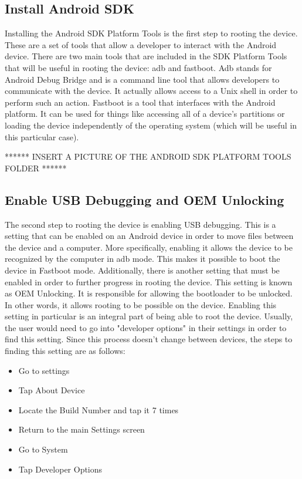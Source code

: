 \subsection{Install Android SDK}
Installing the Android SDK Platform Tools is the first step to rooting the device. These are a set of tools that allow a developer to interact with the Android device.
There are two main tools that are included in the SDK Platform Tools that will be useful in rooting the device: adb and fastboot. Adb stands for Android Debug Bridge and is 
a command line tool that allows developers to communicate with the device. It actually allows access to a Unix shell in order to perform such an action. Fastboot is a tool that 
interfaces with the Android platform. It can be used for things like accessing all of a device's partitions or loading the device independently of the operating system 
(which will be useful in this particular case).

****** INSERT A PICTURE OF THE ANDROID SDK PLATFORM TOOLS FOLDER ******

\subsection{Enable USB Debugging and OEM Unlocking}
The second step to rooting the device is enabling USB debugging. This is a setting that can be enabled on an Android device in order to move files between the device 
and a computer. More specifically, enabling it allows the device to be recognized by the computer in adb mode. This makes it possible to boot the device in Fastboot mode. 
Additionally, there is another setting that must be enabled in order to further progress in rooting the device. This setting is known as OEM Unlocking. It is 
responsible for allowing the bootloader to be unlocked. In other words, it allows rooting to be possible on the device. Enabling this setting in particular is an integral
part of being able to root the device. Usually, the user would need to go into "developer options" in their settings in order to find this setting. Since this process 
doesn't change between devices, the steps to finding this setting are as follows: 

\begin{itemize}

\item Go to settings
\item Tap About Device
\item Locate the Build Number and tap it 7 times
\item Return to the main Settings screen
\item Go to System
\item Tap Developer Options

\end{itemize}

